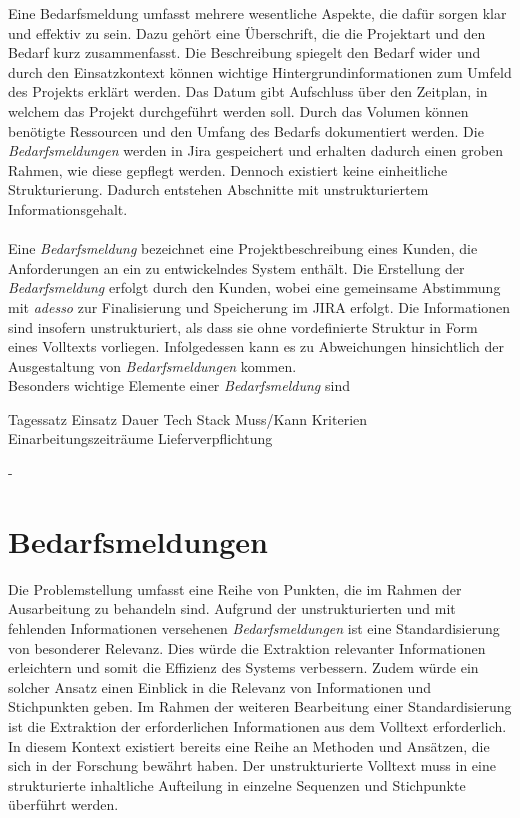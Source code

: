 Eine Bedarfsmeldung umfasst mehrere wesentliche Aspekte, die dafür sorgen klar und effektiv zu sein. Dazu gehört eine Überschrift, die die Projektart und den Bedarf kurz zusammenfasst. Die Beschreibung spiegelt den Bedarf wider und durch den Einsatzkontext können wichtige Hintergrundinformationen zum Umfeld des Projekts erklärt werden. Das Datum gibt Aufschluss über den Zeitplan, in welchem das Projekt durchgeführt werden soll. Durch das Volumen können benötigte Ressourcen und den Umfang des Bedarfs dokumentiert werden. Die \emph{Bedarfsmeldungen} werden in Jira gespeichert und erhalten dadurch einen groben Rahmen, wie diese gepflegt werden. Dennoch existiert keine einheitliche Strukturierung. Dadurch entstehen Abschnitte mit unstrukturiertem Informationsgehalt.\\
\\
Eine \emph{Bedarfsmeldung} bezeichnet eine Projektbeschreibung eines Kunden, die Anforderungen an ein zu entwickelndes System enthält. Die Erstellung der \emph{Bedarfsmeldung} erfolgt durch den Kunden, wobei eine gemeinsame Abstimmung mit \emph{adesso} zur Finalisierung und Speicherung im JIRA erfolgt. Die Informationen sind insofern unstrukturiert, als dass sie ohne vordefinierte Struktur in Form eines Volltexts vorliegen. Infolgedessen kann es zu Abweichungen hinsichtlich der Ausgestaltung von \emph{Bedarfsmeldungen} kommen.\\

Besonders wichtige Elemente einer \emph{Bedarfsmeldung} sind

Tagessatz
Einsatz
Dauer
Tech Stack
Muss/Kann Kriterien
Einarbeitungszeiträume
Lieferverpflichtung

-

\section{Bedarfsmeldungen}
Die Problemstellung umfasst eine Reihe von Punkten, die im Rahmen der Ausarbeitung zu behandeln sind. Aufgrund der unstrukturierten und mit fehlenden Informationen versehenen \emph{Bedarfsmeldungen} ist eine Standardisierung von besonderer Relevanz. Dies würde die Extraktion relevanter Informationen erleichtern und somit die Effizienz des Systems verbessern. Zudem würde ein solcher Ansatz einen Einblick in die Relevanz von Informationen und Stichpunkten geben. Im Rahmen der weiteren Bearbeitung einer Standardisierung ist die Extraktion der erforderlichen Informationen aus dem Volltext erforderlich. In diesem Kontext existiert bereits eine Reihe an Methoden und Ansätzen, die sich in der Forschung bewährt haben. Der unstrukturierte Volltext muss in eine strukturierte inhaltliche Aufteilung in einzelne Sequenzen und Stichpunkte überführt werden.\\




